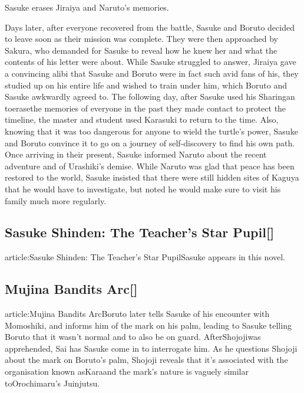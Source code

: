 \documentclass[a4paper,12pt]{article}
\begin{document}
Sasuke erases Jiraiya and Naruto's memories.\\ \par \vspace{0.5cm}

Days later, after everyone recovered from the battle, Sasuke and Boruto decided to leave soon as their mission was complete. They were then approached by Sakura, who demanded for Sasuke to reveal how he knew her and what the contents of his letter were about. While Sasuke struggled to answer, Jiraiya gave a convincing alibi that Sasuke and Boruto were in fact such avid fans of his, they studied up on his entire life and wished to train under him, which Boruto and Sasuke awkwardly agreed to. The following day, after Sasuke used his Sharingan toerasethe memories of everyone in the past they made contact to protect the timeline, the master and student used Karasuki to return to the time. Also, knowing that it was too dangerous for anyone to wield the turtle's power, Sasuke and Boruto convince it to go on a journey of self-discovery to find his own path. Once arriving in their present, Sasuke informed Naruto about the recent adventure and of Urashiki's demise. While Naruto was glad that peace has been restored to the world, Sasuke insisted that there were still hidden sites of Kaguya that he would have to investigate, but noted he would make sure to visit his family much more regularly.\\ \par \vspace{0.5cm}

\subsection*{Sasuke Shinden: The Teacher's Star Pupil[]}\n\nMain article:Sasuke Shinden: The Teacher's Star PupilSasuke appears in this novel.\\ \par \vspace{0.5cm}

\subsection*{Mujina Bandits Arc[]}\n\nMain article:Mujina Bandits ArcBoruto later tells Sasuke of his encounter with Momoshiki, and informs him of the mark on his palm, leading to Sasuke telling Boruto that it wasn't normal and to also be on guard. AfterShojojiwas apprehended, Sai has Sasuke come in to interrogate him. As he questions Shojoji about the mark on Boruto's palm, Shojoji reveals that it's associated with the organisation known asKaraand the mark's nature is vaguely similar toOrochimaru's Juinjutsu.\\ \par \vspace{0.5cm}
\end{document}
